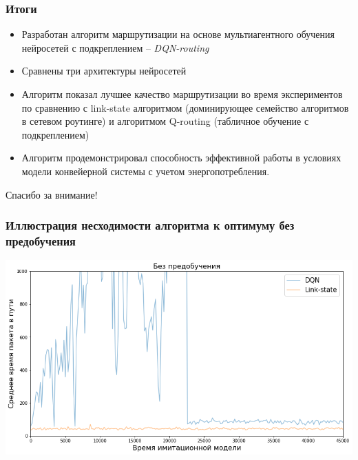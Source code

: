 \documentclass{beamer}
\begin{document}

\begin{frame}
  \frametitle{Итоги}
  \begin{itemize}
    \item Разработан алгоритм маршрутизации на основе мультиагентного обучения
      нейросетей с подкреплением -- \textit{DQN-routing}
    \item Сравнены три архитектуры нейросетей
    \item Алгоритм показал лучшее качество маршрутизации во время экспериментов
      по сравнению с link-state алгоритмом (доминирующее семейство алгоритмов в
      сетевом роутинге) и алгоритмом Q-routing (табличное обучение с
      подкреплением)
    \item Алгоритм продемонстрировал способность эффективной работы в условиях
      модели конвейерной системы с учетом энергопотребления.
  \end{itemize}
\end{frame}

\begin{frame}
  \begin{center}
    {\Huge Спасибо за внимание!}
  \end{center}
\end{frame}

\appendix

\begin{frame}
  \frametitle{Иллюстрация несходимости алгоритма к оптимуму без предобучения}
  \includegraphics[width=\textwidth]{non-convergence}
\end{frame}
\end{document}
